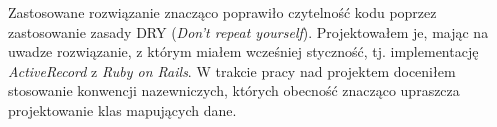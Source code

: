 Zastosowane rozwiązanie znacząco poprawiło czytelność kodu poprzez zastosowanie zasady DRY (\emph{Don't repeat yourself}). Projektowałem je, mając na uwadze rozwiązanie, z którym miałem wcześniej styczność, tj. implementację \emph{ActiveRecord} z \emph{Ruby on Rails}. W trakcie pracy nad projektem doceniłem stosowanie konwencji nazewniczych, których obecność znacząco upraszcza projektowanie klas mapujących dane.